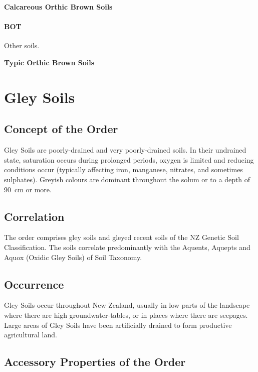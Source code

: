 \documentclass[
  letterpaper,
  DIV=11,
  numbers=noendperiod]{scrreprt}
\begin{document}
\textbf{Calcareous Orthic Brown Soils}

\hypertarget{sec-key-BOT}{%
\subsubsection{\texorpdfstring{\textbf{BOT}}{BOT}}\label{sec-key-BOT}}

Other soils.

\textbf{Typic Orthic Brown Soils}


\hypertarget{sec-ord-G}{%
\chapter{Gley Soils}\label{sec-ord-G}}

\hypertarget{sec-con-G}{%
\section{Concept of the Order}\label{sec-con-G}}

Gley Soils are poorly-drained and very poorly-drained soils. In their
undrained state, saturation occurs during prolonged periods, oxygen is
limited and reducing conditions occur (typically affecting iron,
manganese, nitrates, and sometimes sulphates). Greyish colours are
dominant throughout the solum or to a depth of 90~cm or more.

\hypertarget{sec-cor-G}{%
\section{Correlation}\label{sec-cor-G}}

The order comprises gley soils and gleyed recent soils of the NZ Genetic
Soil Classification. The soils correlate predominantly with the Aquents,
Aquepts and Aquox (Oxidic Gley Soils) of Soil Taxonomy.

\hypertarget{sec-occ-G}{%
\section{Occurrence}\label{sec-occ-G}}

Gley Soils occur throughout New Zealand, usually in low parts of the
landscape where there are high groundwater-tables, or in places where
there are seepages. Large areas of Gley Soils have been artificially
drained to form productive agricultural land.

\hypertarget{sec-acc-G}{%
\section{Accessory Properties of the Order}\label{sec-acc-G}}
\end{document}
